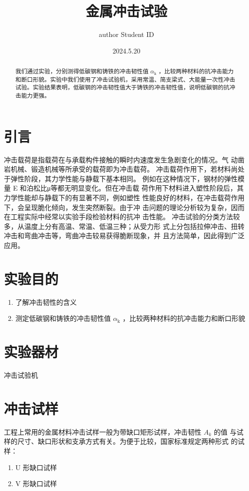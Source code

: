 \documentclass{article}
\title{\heiti\zihao{2} 金属冲击试验}
\author{\songti author  Student ID  }
\date{2024.5.20}
\begin{document}
    \maketitle

\begin{abstract}
    我们通过实验，分别测得低碳钢和铸铁的冲击韧性值 $\alpha_{\mathrm{k}}$ ，比较两种材料的抗冲击能力和断口形貌。实验中我们使用了冲击试验机，采用常温、简支梁式、大能量一次性冲击试验。实验结果表明，低碳钢的冲击韧性值大于铸铁的冲击韧性值，说明低碳钢的抗冲击能力更强。

    
\end{abstract}
\section{引言}
冲击载荷是指载荷在与承载构件接触的瞬时内速度发生急剧变化的情况。气
动凿岩机械、锻造机械等所承受的载荷即为冲击载荷。 
冲击载荷作用下，若材料尚处于弹性阶段，其力学性能与静载下基本相同。
例如在这种情况下，钢材的弹性模量 E 和泊松比μ等都无明显变化。但在冲击载
荷作用下材料进入塑性阶段后，其力学性能却与静载下的有显著不同，例如塑性
性能良好的材料，在冲击载荷作用下，会呈现脆化倾向，发生突然断裂。由于冲
击问题的理论分析较为复杂，因而在工程实际中经常以实验手段检验材料的抗冲
击性能。 
冲击试验的分类方法较多，从温度上分有高温、常温、低温三种；从受力形
式上分包括拉伸冲击、扭转冲击和弯曲冲击等，弯曲冲击较易获得脆断现象，并
且方法简单，因此得到广泛应用。


\section{实验目的}
\begin{enumerate}
    \item 了解冲击韧性的含义 
    \item 测定低碳钢和铸铁的冲击韧性值 $\alpha_{\mathrm{k}}$ ，比较两种材料的抗冲击能力和断口形貌
\end{enumerate}

\section{实验器材}

冲击试验机
 
\section{冲击试样}
工程上常用的金属材料冲击试样一般为带缺口矩形试样，冲击韧性 $A_k$ 的值
与试样的尺寸、缺口形状和支承方式有关。为便于比较，国家标准规定两种形式
的试样：   
    \begin{enumerate}
        \item U 形缺口试样
        \item V 形缺口试样
    \end{enumerate} 
\end{document}
